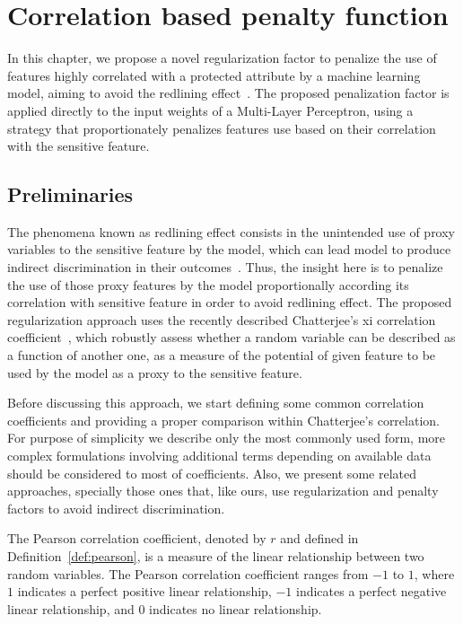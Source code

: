 \chapter{Correlation based penalty function}\label{chap:rpr}

In this chapter, we propose a novel regularization factor to penalize the use of features highly correlated with a protected attribute by a machine learning model, aiming to avoid the redlining effect~\citep{Pedreschi2008}. The proposed penalization factor is applied directly to the input weights of a Multi-Layer Perceptron, using a strategy that proportionately penalizes features use based on their correlation with the sensitive feature.

\section{Preliminaries} \label{sec:rpr_preliminaries}

The phenomena known as redlining effect consists in the unintended use of proxy variables to the sensitive feature by the model, which can lead model to produce indirect discrimination in their outcomes~\citep{Pedreschi2008}.  Thus, the insight here is to penalize the use of those proxy features by the model proportionally according its correlation with sensitive feature in order to avoid redlining effect. The proposed regularization approach uses the recently described Chatterjee's xi correlation coefficient~\citep{chatterjee2020new}, which robustly assess whether a random variable can be described as a function of another one, as a measure of the potential of given feature to be used by the model as a proxy to the sensitive feature. 

Before discussing this approach, we start defining some common correlation coefficients and providing a proper comparison within Chatterjee's correlation. For purpose of simplicity we describe only the most commonly used form, more complex formulations involving additional terms depending on available data should be considered to most of coefficients. Also, we present some related approaches, specially those ones that, like ours, use regularization and penalty factors to avoid indirect discrimination.

The Pearson correlation coefficient, denoted by $r$ and defined in Definition~\ref{def:pearson}, is a measure of the linear relationship between two random variables. The Pearson correlation coefficient ranges from $-1$ to $1$, where $1$ indicates a perfect positive linear relationship, $-1$ indicates a perfect negative linear relationship, and $0$ indicates no linear relationship.

